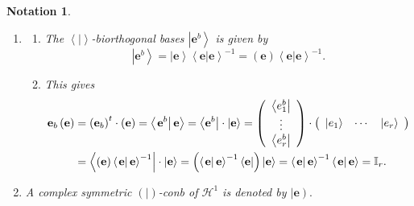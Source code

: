 \documentclass[aps,preprint]{revtex4}%
\newtheorem{notation}[theorem]{Notation}
\begin{document}
\begin{notation}
\begin{enumerate}
\item
\begin{enumerate}
\item The $\left\langle \left.  {}\right\vert \right\rangle $-biorthogonal
bases $\left\vert \mathbf{e}^{b}\right\rangle $ is given by
\begin{equation}
\left\vert \mathbf{e}^{b}\right\rangle =\left\vert \mathbf{e}\right\rangle
\left\langle \left.  \mathbf{e}\right\vert \mathbf{e}\right\rangle
^{-1}=\left(  \mathbf{e}\right)  \left\langle \left.  \mathbf{e}\right\vert
\mathbf{e}\right\rangle ^{-1}.
\end{equation}


\item This gives%
\begin{align}
\mathbf{e}_{b}\left(  \mathbf{e}\right)   &  =\left(  \mathbf{e}_{b}\right)
^{t}\cdot\left(  \mathbf{e}\right)  =\left\langle \left.  \mathbf{e}%
^{b}\right\vert \mathbf{e}\right\rangle =\left\langle \mathbf{e}%
^{b}\right\vert \cdot\left\vert \mathbf{e}\right\rangle =\left(
\begin{array}
[c]{c}%
\left\langle e_{1}^{b}\right\vert \\
\vdots\\
\left\langle e_{r}^{b}\right\vert
\end{array}
\right)  \cdot\left(
\begin{array}
[c]{ccc}%
\left\vert e_{1}\right\rangle  & \cdots & \left\vert e_{r}\right\rangle
\end{array}
\right) \\
&  =\left\langle \left(  \mathbf{e}\right)  \left\langle \left.
\mathbf{e}\right\vert \mathbf{e}\right\rangle ^{-1}\right\vert \cdot\left\vert
\mathbf{e}\right\rangle =\left(  \left\langle \left.  \mathbf{e}\right\vert
\mathbf{e}\right\rangle ^{-1}\left\langle \mathbf{e}\right\vert \right)
\left\vert \mathbf{e}\right\rangle =\left\langle \left.  \mathbf{e}\right\vert
\mathbf{e}\right\rangle ^{-1}\left\langle \left.  \mathbf{e}\right\vert
\mathbf{e}\right\rangle =\mathbb{I}_{r}.
\end{align}

\end{enumerate}

\item A complex symmetric $\left(  \left.  {}\right\vert \right)  $-conb of
$\mathcal{H}^{1}$ is denoted by $\left\vert \mathbf{e}\right)  .$


\end{enumerate}
\end{notation}
\end{document}
